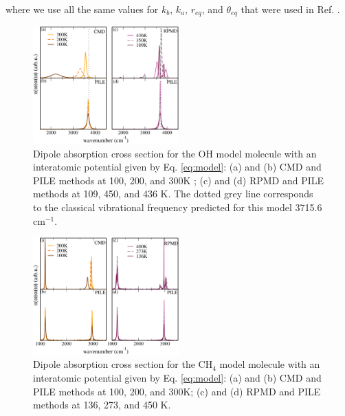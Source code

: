 \documentclass[aps,prb,superscriptaddress,amsmath,amssymb,showpacs,twocolumn]{revtex4}
\begin{document}
\noindent where we use all the same values for $k_b$, $k_a$, $r_{eq}$, and $\theta_{eq}$ that were used in Ref. \cite{witt+09jcp}.

\begin{figure}[htbp]
\centering
\includegraphics[width=0.5\textwidth]{figures/comparison_oh_factors.pdf}
\caption{Dipole absorption cross section for the OH model molecule with an interatomic potential given by Eq. \ref{eq:model}: (a) and (b) CMD and PILE methods at 100, 200, and 300K ; (c)  and (d) RPMD and PILE methods at 109, 450, and 436 K. The dotted grey line corresponds to the classical vibrational frequency predicted for this model 3715.6 cm$^{-1}$.}
\label{fig:oh-rpmd-cmd-pile}
\end{figure}

\begin{figure}[htbp]
\centering
\includegraphics[width=0.5\textwidth]{figures/comparison_ch4_factors.pdf}
\caption{Dipole absorption cross section for the CH$_4$ model molecule with an interatomic potential given by Eq. \ref{eq:model}: (a) and (b) CMD and PILE methods at 100, 200, and 300K; (c) and (d) RPMD and PILE methods at 136, 273, and 450 K.}
\label{fig:ch4-rpmd-cmd-pile}
\end{figure}
\end{document}

